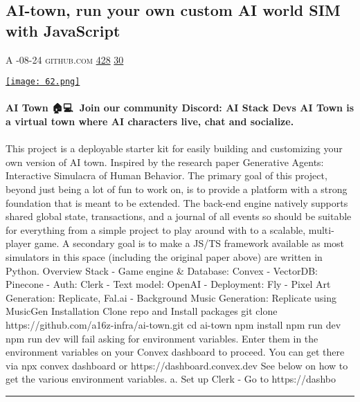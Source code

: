 \documentclass[10pt,a4paper]{article}
\begin{document}
\begin{multicols*}{2}

\noindent\begin{minipage}{\linewidth}
\subsection{AI-town, run your own custom AI world SIM with JavaScript}
\textsc{\footnotesize
{\scriptsize\faUser}\space 
A 
{\scriptsize\faCalendar}-08-24 
{\scriptsize\faGithub}\space 
github.com 
{\scriptsize\faThumbsOUp}\space 
\href{http://news.ycombinator.com/item?id=37128293\&utm\_term=comment}{428} 
{\scriptsize\faComments}\space 
\href{http://news.ycombinator.com/item?id=37128293\&utm\_term=comment}{30} 
}
\par\medskip\noindent
\href{https://github.com/a16z-infra/ai-town?utm\_source=hackernewsletter\&utm\_medium=email\&utm\_term=fun}{
    \texttt{[image: 62.png]}
}
\end{minipage}
\paragraph{}
\textbf{AI Town 🏠💻💌
Join our community Discord: AI Stack Devs
AI Town is a virtual town where AI characters live, chat and socialize.}
\paragraph{}

This project is a deployable starter kit for easily building and customizing your own version of AI town. Inspired by the research paper Generative Agents: Interactive Simulacra of Human Behavior.
The primary goal of this project, beyond just being a lot of fun to work on, is to provide a platform with a strong foundation that is meant to be extended. The back-end engine natively supports shared global state, transactions, and a journal of all events so should be suitable for everything from a simple project to play around with to a scalable, multi-player game. A secondary goal is to make a JS/TS framework available as most simulators in this space (including the original paper above) are written in Python.
Overview
Stack
- Game engine \& Database: Convex
- VectorDB: Pinecone
- Auth: Clerk
- Text model: OpenAI
- Deployment: Fly
- Pixel Art Generation: Replicate, Fal.ai
- Background Music Generation: Replicate using MusicGen
Installation
Clone repo and Install packages
git clone https://github.com/a16z-infra/ai-town.git cd ai-town npm install npm run dev
npm run dev will fail asking for environment variables.
Enter them in the environment variables on your Convex dashboard to proceed.
You can get there via
npx convex dashboard or https://dashboard.convex.dev
See below on how to get the various environment variables.
a. Set up Clerk
- Go to https://dashbo
\par\noindent\textcolor{red}{\rule{\linewidth}{0.2mm}}
\vfill
\null
\noindent\begin{minipage}{\linewidth}

\end{minipage}
\end{multicols*}
\end{document}
